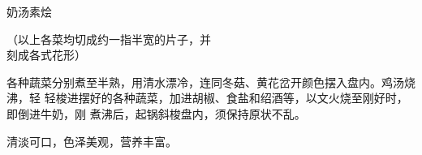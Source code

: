 \begin{recipe}{奶汤素烩}

\ingredients

{\kafamily\null\hspace{4em}（以上各菜均切成约一指半宽的片子，并\\
 \null\hspace{5em}刻成各式花形）\\}

\preparation

各种蔬菜分别煮至半熟，用清水漂冷，连同冬菇、黄花岔开颜色摆入盘内。鸡汤烧沸，轻
轻梭进摆好的各种蔬菜，加进胡椒、食盐和绍酒等，以文火烧至刚好时，即倒进牛奶，刚
煮沸后，起锅斜梭盘内，须保持原状不乱。

\features

清淡可口，色泽美观，营养丰富。

\end{recipe}

